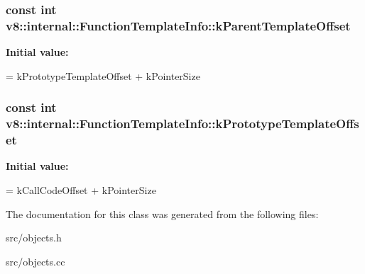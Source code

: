 \subsubsection[{k\+Parent\+Template\+Offset}]{\setlength{\rightskip}{0pt plus 5cm}const int v8\+::internal\+::\+Function\+Template\+Info\+::k\+Parent\+Template\+Offset\hspace{0.3cm}{\ttfamily [static]}}\label{classv8_1_1internal_1_1_function_template_info_a55c986ed16644ef6ed27d17c09f2ab3a}
{\bfseries Initial value\+:}
\begin{DoxyCode}
=
      kPrototypeTemplateOffset + kPointerSize
\end{DoxyCode}
\hypertarget{classv8_1_1internal_1_1_function_template_info_adb0f454aeb8a89f2d58cb96fd79246a8}{}
\subsubsection[{k\+Prototype\+Template\+Offset}]{\setlength{\rightskip}{0pt plus 5cm}const int v8\+::internal\+::\+Function\+Template\+Info\+::k\+Prototype\+Template\+Offset\hspace{0.3cm}{\ttfamily [static]}}\label{classv8_1_1internal_1_1_function_template_info_adb0f454aeb8a89f2d58cb96fd79246a8}
{\bfseries Initial value\+:}
\begin{DoxyCode}
=
      kCallCodeOffset + kPointerSize
\end{DoxyCode}


The documentation for this class was generated from the following files\+:\begin{DoxyCompactItemize}
\item 
src/objects.\+h\item 
src/objects.\+cc\end{DoxyCompactItemize}
